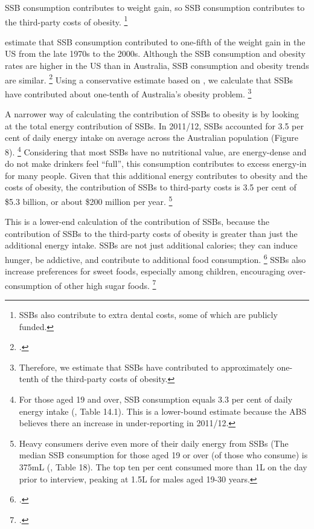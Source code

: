 \documentclass[embargoed]{grattan}
\begin{document}
SSB consumption contributes to weight gain, so SSB consumption contributes to the third-party costs of obesity.%
\footnote{SSBs also contribute to extra dental costs, some of which are publicly funded.}

\textcite{Woodward-Lopez2010whatextenthave} estimate that SSB consumption contributed to one-fifth of the weight gain in the US from the late 1970s to the 2000s.
Although the SSB consumption and obesity rates are higher in the US than in Australia, SSB consumption and obesity trends are similar.%
\footcites{Popkin2016Sweeteningglobaldiet}{Silver2015IdBuyEmerging} Using a conservative estimate based on \textcite{Woodward-Lopez2010whatextenthave}, we calculate that SSBs have contributed about one-tenth of Australia's obesity problem.%
\footnote{Therefore, we estimate that SSBs have contributed to approximately one-tenth of the third-party costs of obesity.}

A narrower way of calculating the contribution of SSBs to obesity is by looking at the total energy contribution of SSBs.
In 2011/12, SSBs accounted for 3.5 per cent of daily energy intake on average across the Australian population (Figure 8).%
\footnote{For those aged 19 and over, SSB consumption equals 3.3 per cent of daily energy intake (\textcite{ABS20144364055007AustralianHealth}, Table 14.1).
This is a lower-bound estimate because the ABS believes there an increase in under-reporting in 2011/12.} Considering that most SSBs have no nutritional value, are energy-dense and do not make drinkers feel ``full'', this consumption contributes to excess energy-in for many people.
Given that this additional energy contributes to obesity and the costs of obesity, the contribution of SSBs to third-party costs is 3.5 per cent of \$5.3 billion, or about \$200 million per year. \footnote{Heavy consumers derive even more of their daily energy from SSBs (The median SSB consumption for those aged 19 or over (of those who consume) is 375mL (\textcite{ABS2013436405503AustralianHealth}, Table 18).
The top ten per cent consumed more than 1L on the day prior to interview, peaking at 1.5L for males aged 19-30 years.}

This is a lower-end calculation of the contribution of SSBs, because the contribution of SSBs to the third-party costs of obesity is greater than just the additional energy intake.
SSBs are not just additional calories; they can induce hunger, be addictive, and contribute to additional food consumption.%
\footcites{Vartanian2007Effectssoftdrink}{Lennerz2013Effectsdietaryglycemic}{Schulte2015Currentconsiderationsregarding}{Fortuna2012obesityepidemicfood}{Popkin2012Sugarybeveragesrepresent}{Panel2014POLICYBRIEFoptions} SSBs also increase preferences for sweet foods, especially among children, encouraging over-consumption of other high sugar foods.%
\footcite{Popkin2012Sugarybeveragesrepresent}
\end{document}
